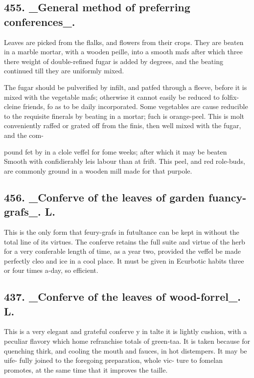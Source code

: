 \subsection*{455. \_General method of preferring conferences\_.}
Leaves are picked from the flalks, and flowers from
their crops. They are beaten in a marble mortar,
with a wooden peille, into a smooth mafs after
which three there weight of double-refined fugar is
added by degrees, and the beating continued till
they are uniformly mixed.\par\medskip
The fugar should be pulverified by infilt, and patfed
through a fleeve, before it is mixed with the vegetable
mafs; otherwise it cannot easily be reduced to folfix-
cleine friends, fo as to be daily incorporated. Some
vegetables are cause reducible to the requisite finerals
by beating in a mortar; fuch is orange-peel. This
is molt conveniently raffed or grated off from the
finis, then well mixed with the fugar, and the com-\par\medskip
pound fet by in a clole veffel for fome weeks; after
which it may be beaten Smooth with confidierably leis
labour than at frift. This peel, and red role-buds,
are commonly ground in a wooden mill made for that
purpole.\par\medskip
\subsection*{456. \_Conferve of the leaves of garden fuancy-grafs\_. L.}
This is the only form that feury-grafs in futultance
can be kept in without the total line of its virtues.
The conferve retains the full suite and virtue of the
herb for a very conferable length of time, as a year
two, provided the veffel be made perfectly cleo
and ice in a cool place. It must be given in Ecurbotic
habits three or four times a-day, so efficient.\par\medskip
\subsection*{437. \_Conferve of the leaves of wood-forrel\_. L.}
This is a very elegant and grateful conferve y in
talte it is lightly cushion, with a peculiar flavory
which home refranchise totals of green-taa. It is taken
because for quenching thirk, and cooling the
mouth and fauces, in hot distempers. It may be uife-
fully joined to the foregoing preparation, whole vic-
ture to fomelan promotes, at the same time that it
improves the taille.\par\medskip
